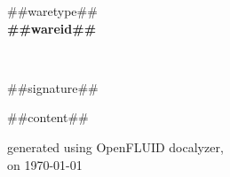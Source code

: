 \documentclass{##docstyle##}
\begin{document}
\begin{center}
  {##waretype##}\\
  \vspace{0.8em}
  {\huge \bfseries ##wareid##}\\
\end{center}\\
\vspace{1.5em}

##signature##

\vspace{1.5em}

\begin{multicols}{2}

##content##

\end{multicols}

\vspace{3em}

\small
\begin{flushright}generated using OpenFLUID docalyzer,\\
on \today\end{flushright}
\small
\end{document}
